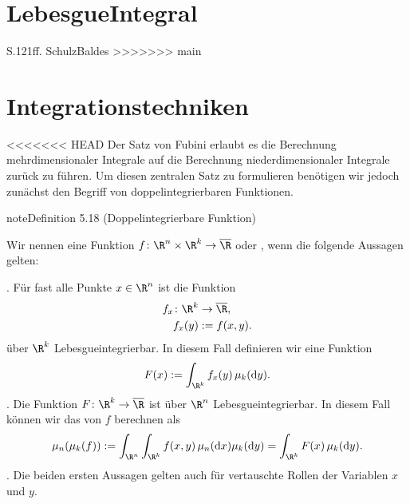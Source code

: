 \documentclass[letterpaper,10pt,english]{jupyterBook}
\begin{document}
\section{Lebesgue\sphinxhyphen{}Integral}
\label{\detokenize{masstheorie/lebesgue_integral:lebesgue-integral}}\label{\detokenize{masstheorie/lebesgue_integral::doc}}
\sphinxAtStartPar
S.121ff. Schulz\sphinxhyphen{}Baldes
>>>>>>> main


\section{Integrationstechniken}
\label{\detokenize{masstheorie/integrationstechnik:integrationstechniken}}\label{\detokenize{masstheorie/integrationstechnik::doc}}
<<<<<<< HEAD
\sphinxAtStartPar
Der Satz von Fubini erlaubt es die Berechnung mehrdimensionaler Integrale auf die Berechnung niederdimensionaler Integrale zurück zu führen.
Um diesen zentralen Satz zu formulieren benötigen wir jedoch zunächst den Begriff von doppelintegrierbaren Funktionen.
\label{masstheorie/integrationstechnik:definition-0}
\begin{sphinxadmonition}{note}{Definition 5.18 (Doppelintegrierbare Funktion)}



\sphinxAtStartPar
Wir nennen eine Funktion \(f \colon \R^n \times \R^k \rightarrow \overline{\R}\)  oder ,
wenn die folgende Aussagen gelten:

. Für fast alle Punkte \(x \in \R^n\) ist die Funktion
\begin{equation*}
\begin{split}f_x \colon \R^k &\rightarrow \overline{\R},\\
f_x(y) &:= f(x,y).\end{split}
\end{equation*}
\sphinxAtStartPar
über \(\R^k\) Lebesgue\sphinxhyphen{}integrierbar.
In diesem Fall definieren wir eine Funktion
\begin{equation*}
\begin{split}F(x) := \int_{\R^k} f_x(y) \, \mu_k(\mathrm{d}y).\end{split}
\end{equation*}
. Die Funktion \(F \colon \R^k \rightarrow \overline{\R}\) ist über \(\R^n\) Lebesgue\sphinxhyphen{}integrierbar.
In diesem Fall können wir das  von \(f\) berechnen als
\begin{equation*}
\begin{split}\mu_n(\mu_k(f)) := \int_{\R^n}\int_{\R^k} f(x,y) \, \mu_n(\mathrm{d}x) \mu_k(\mathrm{d}y) = \int_{\R^k} F(x) \, \mu_k(\mathrm{d}y).\end{split}
\end{equation*}
. Die beiden ersten Aussagen gelten auch für vertauschte Rollen der Variablen \(x\) und \(y\).
\end{sphinxadmonition}
\end{document}
